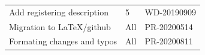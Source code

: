 \documentclass[11pt,a4paper]{ivoa}
\begin{document}
\begin{table}[H]
\begin{tabular}{p{3.75in}p{0.92in}p{0.8in}}
\multicolumn{1}{|p{3.75in}}{Add registering description} & 
\multicolumn{1}{|p{0.72in}}{5} & 
\multicolumn{1}{|p{0.9in}|}{{\fontsize{10pt}{12.0pt}\selectfont WD-20190909}} \\
\multicolumn{1}{|p{3.75in}}{Migration to LaTeX/github} & 
\multicolumn{1}{|p{0.72in}}{All} & 
\multicolumn{1}{|p{0.9in}|}{{\fontsize{10pt}{12.0pt}\selectfont PR-20200514}} \\
\multicolumn{1}{|p{3.75in}}{Formating changes and typos} & 
\multicolumn{1}{|p{0.72in}}{All} & 
\multicolumn{1}{|p{0.9in}|}{{\fontsize{10pt}{12.0pt}\selectfont PR-20200811}} \\
\hline
\end{tabular}
 \end{table}

\pagebreak



\end{document}
